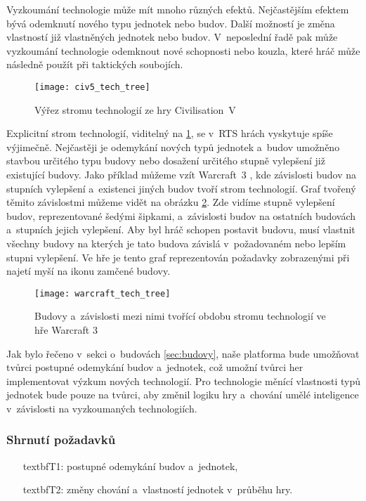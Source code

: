 Vyzkoumání technologie může mít mnoho různých efektů. Nejčastějším efektem bývá odemknutí nového typu jednotek nebo budov. Další možností je změna vlastností již vlastněných jednotek nebo budov. V~neposlední řadě pak může vyzkoumání technologie odemknout nové schopnosti nebo kouzla, které hráč může následně použít při taktických soubojích. 

\begin{figure}[h]	
	\centering
	\texttt{[image: civ5\_tech\_tree]}
	\caption{Výřez stromu technologií ze hry Civilisation~V \citep{site:civ5}}
	\label{fig:civ5techtree}
\end{figure}


Explicitní strom technologií, viditelný na \ref{fig:civ5techtree}, se v~RTS hrách vyskytuje spíše výjimečně. Nejčastěji je odemykání nových typů jednotek a~budov umožněno stavbou určitého typu budovy nebo dosažení určitého stupně vylepšení již existující budovy. Jako příklad můžeme vzít Warcraft~3 \citep{site:warcraft3}, kde závislosti budov na stupních vylepšení a~existenci jiných budov tvoří strom technologií. Graf tvořený těmito závislostmi můžeme vidět na obrázku \ref{fig:warcrafttechtree}. Zde vidíme stupně vylepšení budov, reprezentované šedými šipkami, a~závislosti budov na ostatních budovách a~stupních jejich vylepšení. Aby byl hráč schopen postavit budovu, musí vlastnit všechny budovy na kterých je tato budova závislá v~požadovaném nebo lepším stupni vylepšení. Ve hře je tento graf reprezentován požadavky zobrazenými při najetí myší na ikonu zamčené budovy.

\begin{figure}[h]	
	\centering
	\texttt{[image: warcraft\_tech\_tree]}
	\caption{Budovy a~závislosti mezi nimi tvořící obdobu stromu technologií ve hře Warcraft 3}
	\label{fig:warcrafttechtree}
\end{figure}

Jak bylo řečeno v~sekci o~budovách \ref{sec:budovy}, naše platforma bude umožňovat tvůrci postupné odemykání budov a~jednotek, což umožní tvůrci her implementovat výzkum nových technologií. Pro technologie měnící vlastnosti typů jednotek bude pouze na tvůrci, aby změnil logiku hry a~chování umělé inteligence v~závislosti na vyzkoumaných technologiích.

\subsubsection{Shrnutí požadavků}
\label{sec:requirements}

\begin{itemize}
	\item[textbf{T1:}] postupné odemykání budov a~jednotek,
	\item[textbf{T2:}] změny chování a~vlastností jednotek v~průběhu hry.
\end{itemize}

